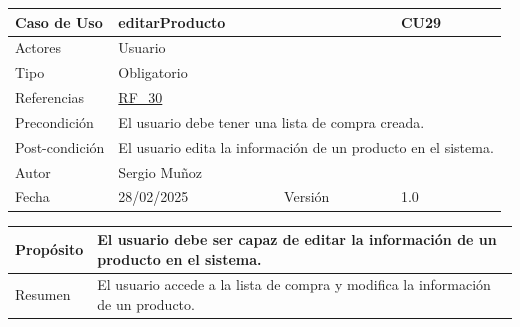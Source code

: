 \newpage

\begin{table}[H]
    \centering
    \begin{tabular}{| m{} | m{} | m{} | m{} |}
        \hline
        \rowcolor[HTML]{C0C0C0} Caso de Uso & \multicolumn{2}{|m{0.43\textwidth}|}{editarProducto} &  CU29\\ 
        \hline
        Actores & \multicolumn{3}{l|}{Usuario} \\ 
        \hline
        Tipo & \multicolumn{3}{l|}{Obligatorio} \\ 
        \hline
        Referencias & \multicolumn{3}{l|}{\hyperref[req:RF30]{RF\_30}} \\ 
        \hline
        Precondición & \multicolumn{3}{m{0.67\textwidth}|}{El usuario debe tener una lista de compra creada.} \\ 
        \hline
        Post-condición & \multicolumn{3}{m{0.67\textwidth}|}{El usuario edita la información de un producto en el sistema.} \\ 
        \hline
        Autor & \multicolumn{3}{l|}{Sergio Muñoz} \\ 
        \hline
        Fecha & 28/02/2025 & Versión & 1.0 \\ 
        \hline
    \end{tabular}
\end{table}

\begin{table}[H]
    \centering
    \begin{tabular}{| m{} | m{} | m{} | m{} |}
        \hline
        Propósito & \multicolumn{3}{m{0.67\textwidth}|}{El usuario debe ser capaz de editar la información de un producto en el sistema.} \\ 
        \hline
        Resumen & \multicolumn{3}{m{0.67\textwidth}|}{El usuario accede a la lista de compra y modifica la información de un producto.} \\ 
        \hline
    \end{tabular}
\end{table}

